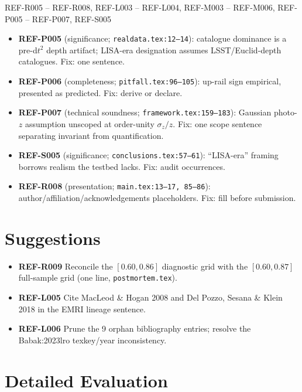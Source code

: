 \documentclass[11pt]{article}
\begin{document}
\begin{MinorIssueBox}{REF-R005 -- REF-R008, REF-L003 -- REF-L004, REF-M003 -- REF-M006, REF-P005 -- REF-P007, REF-S005}
\begin{itemize}
  \item \textbf{REF-P005} (significance; \texttt{realdata.tex:12--14}): catalogue dominance is a pre-d$t^2$ depth artifact; LISA-era designation assumes LSST/Euclid-depth catalogues. Fix: one sentence.
  \item \textbf{REF-P006} (completeness; \texttt{pitfall.tex:96--105}): up-rail sign empirical, presented as predicted. Fix: derive or declare.
  \item \textbf{REF-P007} (technical soundness; \texttt{framework.tex:159--183}): Gaussian photo-$z$ assumption unscoped at order-unity $\sigma_z/z$. Fix: one scope sentence separating invariant from quantification.
  \item \textbf{REF-S005} (significance; \texttt{conclusions.tex:57--61}): ``LISA-era'' framing borrows realism the testbed lacks. Fix: audit occurrences.
  \item \textbf{REF-R008} (presentation; \texttt{main.tex:13--17, 85--86}): author/affiliation/acknowledgements placeholders. Fix: fill before submission.
\end{itemize}
\end{MinorIssueBox}

\section*{Suggestions}
\begin{itemize}
  \item \textbf{REF-R009} Reconcile the $[0.60, 0.86]$ diagnostic grid with the $[0.60, 0.87]$ full-sample grid (one line, \texttt{postmortem.tex}).
  \item \textbf{REF-L005} Cite MacLeod \& Hogan 2008 and Del Pozzo, Sesana \& Klein 2018 in the EMRI lineage sentence.
  \item \textbf{REF-L006} Prune the 9 orphan bibliography entries; resolve the Babak:2023lro texkey/year inconsistency.
\end{itemize}

\section*{Detailed Evaluation}
\end{document}
